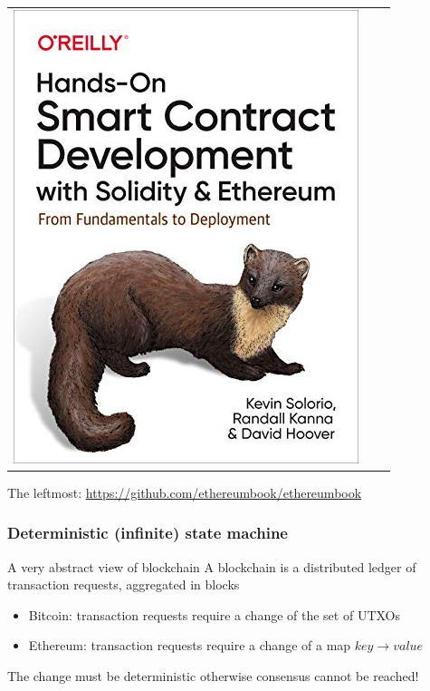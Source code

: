 \documentclass[11pt]{beamer}  %
\begin{document}
\begin{frame}
\begin{center}
\begin{tabular}{c@{\hskip 1cm}c@{\hskip 1cm}c}
      \includegraphics[scale=.25,clip=false]{pictures/hands-on.jpg}
    \end{tabular}
  \end{center}

  \begin{center}
    The leftmost: \url{https://github.com/ethereumbook/ethereumbook}
  \end{center}

\end{frame}

\begin{frame}\frametitle{Deterministic (infinite) state machine}

  \begin{greenbox}{A very abstract view of blockchain}
    A blockchain is a distributed ledger of transaction requests, aggregated in blocks
    \begin{itemize}
    \item[] \hspace*{-3ex}\alert{Bitcoin:} transaction requests require a change of the set of UTXOs
    \item[] \hspace*{-3ex}\alert{Ethereum:} transaction requests require a change of a
      map $\mathit{key}\to\mathit{value}$
    \end{itemize}
    The change must be \alert{deterministic} otherwise consensus cannot be reached!
  \end{greenbox}

\end{frame}
\end{document}
